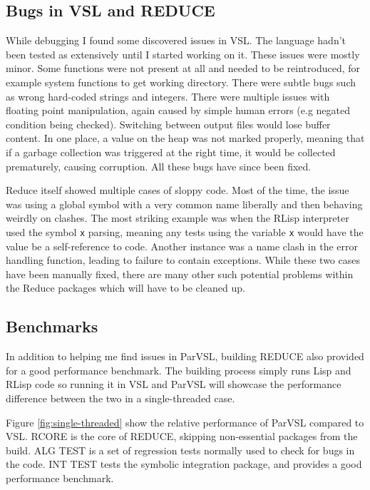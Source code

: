 \subsection{Bugs in VSL and REDUCE}

While debugging I found some discovered issues in VSL. The language hadn't been tested
as extensively until I started working on it. These issues were mostly minor. Some functions
were not present at all and needed to be reintroduced, for example system functions to get
working directory. There were subtle bugs such as wrong
hard-coded strings and integers. There were multiple issues with floating point manipulation,
again caused by simple human errors (e.g negated condition being checked). Switching between
output files would lose buffer content. In one place, a value on the heap was not marked
properly, meaning that if a garbage collection was triggered at the right time, it would
be collected prematurely, causing corruption. All these bugs have since been fixed.

Reduce itself showed multiple cases of sloppy code. Most of the time, the issue was using
a global symbol with a very common name liberally and then behaving weirdly
on clashes. The most striking example was when the RLisp interpreter used the symbol \texttt{x}
parsing, meaning any tests using the variable \texttt{x} would have the value be a self-reference
to code. Another instance was a name clash in the error handling function, leading to failure
to contain exceptions. While these two cases have been manually fixed, there are many other
such potential problems within the Reduce packages which will have to be cleaned up.

\subsection{Benchmarks}

In addition to helping me find issues in ParVSL, building REDUCE also provided for a
good performance benchmark. The building process simply runs Lisp and RLisp code so
running it in VSL and ParVSL will showcase the performance difference between the
two in a single-threaded case.

Figure \ref{fig:single-threaded} show the relative performance of ParVSL compared to VSL.
RCORE is the core of REDUCE, skipping non-essential packages from the build. ALG TEST is
a set of regression tests normally used to check for bugs in the code. INT TEST tests the
symbolic integration package, and provides a good performance benchmark.

